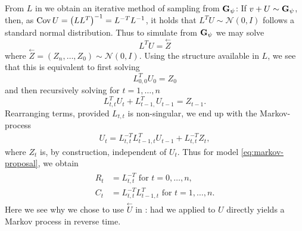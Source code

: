 From $L$ in  we obtain an iterative method of sampling from $\mathbf G_{\psi}$: If $v + U \sim \mathbf G_{\psi}$, then, as $\operatorname{Cov} U = \left( L L^{T} \right)^{-1} = L^{-T}L^{-1}$, it holds that $L^{T}U \sim \mathcal N(0, I)$ follows a standard normal distribution. Thus to simulate from $\mathbf G_{\psi}$ we may solve
$$
L^{T}U = \overset{\leftarrow} Z
$$
where $\overset{\leftarrow}Z = \left( Z_{n}, \dots, Z_{0} \right) \sim \mathcal N(0, I)$. Using the structure available in $L$, we see that this is equivalent to first solving
$$
L_{0,0}^T U_{0} = Z_{0}
$$
and then recursively solving for $t = 1, \dots, n$
$$
L_{t,t}^T U_{t} + L_{t-1, }^{T} U_{t-1} = Z_{t - 1}.
$$
Rearranging terms, provided $L_{t,t}$ is non-singular, we end up with the Markov-process
\begin{align}
\label{eq:rev_time_u}
    U_{t} = L^{-T}_{t,t} L_{t-1, t }^T U_{t - 1} +L^{-T}_{t,t} Z_{t},
\end{align}
where $Z_{t}$ is, by construction, independent of $U_{t}$. Thus for model \eqref{eq:markov-proposal}, we obtain
\begin{align}
    \label{eq:parameters_markov_from_L}
    \begin{split}
    R_{t} &= L^{-T}_{t,t} \text{ for } t = 0, \dots, n,\\
    C_{t} &= L^{-T}_{t,t} L_{t-1, t }^T \text{ for } t =1, \dots, n.
    \end{split}
\end{align}
Here we see why we chose to use $\overset{\leftarrow}U$ in : had we applied  to $U$ directly yields a Markov process in reverse time.

